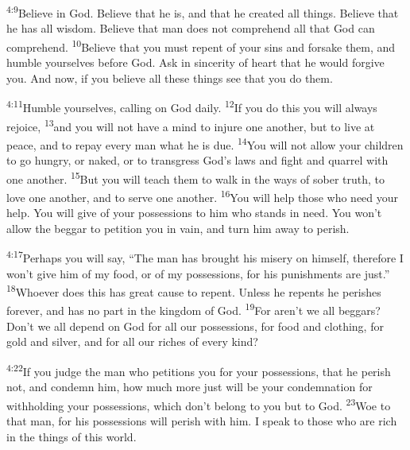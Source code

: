 \documentclass[openany,12pt,english]{book}
\newenvironment{para}{\par\pretolerance=100\tolerance=200\setlength{\emergencystretch}{0.6em}\relax}{\par}
\begin{document}
\begin{para}
    \textsuperscript{4:9}\thinspace{}Be\-lieve in God. Be\-lieve that he is, and that he cre\-at\-ed all things. Be\-lieve that he has all wis\-dom. Be\-lieve that man does not com\-pre\-hend all that God can com\-pre\-hend.
    \textsuperscript{10}\thinspace{}Be\-lieve that you must re\-pent of your sins and for\-sake them, and hum\-ble your\-selves be\-fore God. Ask in sin\-cer\-i\-ty of heart that he would for\-give you. And now, if you be\-lieve all these things see that you do them.
\end{para}

\begin{para}
    \textsuperscript{4:11}\thinspace{}Hum\-ble your\-selves, call\-ing on God dai\-ly.
    \textsuperscript{12}\thinspace{}If you do this you will al\-ways re\-joice,
    \textsuperscript{13}\thinspace{}and you will not have a mind to in\-jure one an\-oth\-er, but to live at peace, and to re\-pay eve\-ry man what he is due.
    \textsuperscript{14}\thinspace{}You will not al\-low your chil\-dren to go hun\-gry, or na\-ked, or to trans\-gress God's laws and fight and quar\-rel with one an\-oth\-er.
    \textsuperscript{15}\thinspace{}But you will teach them to walk in the ways of so\-ber truth, to love one an\-oth\-er, and to serve one an\-oth\-er.
    \textsuperscript{16}\thinspace{}You will help those who need your help. You will give of your possessions to him who stands in need. You won't al\-low the beg\-gar to pe\-ti\-tion you in vain, and turn him a\-way to per\-ish.
\end{para}

\begin{para}
    \textsuperscript{4:17}\thinspace{}Per\-haps you will say, “The man has brought his mis\-er\-y on him\-self, there\-fore I won't give him of my food, or of my possessions, for his punishments are just.”
    \textsuperscript{18}\thinspace{}Who\-ev\-er does this has great cause to re\-pent. Un\-less he repents he perishes for\-ev\-er, and has no part in the king\-dom of God.
    \textsuperscript{19}\thinspace{}For aren't we all beggars? Don't we all de\-pend on God for all our possessions, for food and cloth\-ing, for gold and sil\-ver, and for all our rich\-es of eve\-ry kind?
\end{para}

\begin{para}
    \textsuperscript{4:22}\thinspace{}If you judge the man who petitions you for your possessions, that he per\-ish not, and con\-demn him, how much more just will be your con\-dem\-na\-tion for with\-hold\-ing your possessions, which don't be\-long to you but to God.
    \textsuperscript{23}\thinspace{}Woe to that man, for his possessions will per\-ish with him. I speak to those who are rich in the things of this world.
\end{para}
\end{document}
